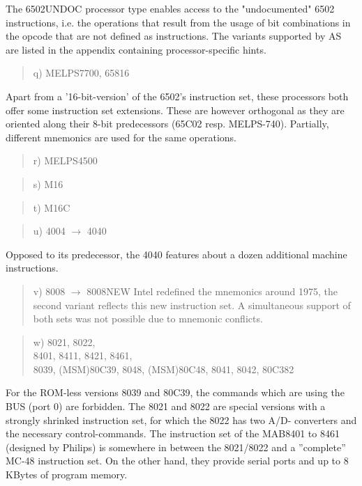 \documentclass[12pt,twoside]{report}
\begin{document}
The 6502UNDOC processor type enables access to the "undocumented"
6502 instructions, i.e. the operations that result from the usage of bit
combinations in the opcode that are not defined as instructions.  The
variants supported by AS are listed in the appendix containing processor-specific
hints.
\begin{quote}
q) MELPS7700, 65816
\end{quote}
Apart from a '16-bit-version' of the 6502's instruction set, these
processors both offer some instruction set extensions.  These are
however orthogonal as they are oriented along their 8-bit
predecessors (65C02 resp. MELPS-740).  Partially, different
mnemonics are used for the same operations.
\begin{quote}
r) MELPS4500
\end{quote}
\begin{quote}
s) M16
\end{quote}
\begin{quote}
t) M16C
\end{quote}
\begin{quote}
u) 4004 $\rightarrow$ 4040
\end{quote}
Opposed to its predecessor, the 4040 features about a dozen additional
machine instructions.
\begin{quote}
v) 8008 $\rightarrow$ 8008NEW
Intel redefined the mnemonics around 1975, the second variant reflects
this new instruction set.  A simultaneous support of both sets was not
possible due to mnemonic conflicts.
\end{quote}
\begin{quote}
w) 8021, 8022, \\
   8401, 8411, 8421, 8461, \\
   8039, (MSM)80C39, 8048, (MSM)80C48, 8041, 8042, 80C382
\end{quote}
For the ROM-less versions 8039 and 80C39, the commands which are
using the BUS (port 0) are forbidden.  The 8021 and 8022 are special
versions with a strongly shrinked instruction set, for which the 8022
has two A/D- converters and the necessary control-commands.  The 
instruction set of the MAB8401 to 8461 (designed by Philips) is
somewhere in between the 8021/8022 and a ''complete'' MC-48 instruction
set.  On the other hand, they provide serial ports and up to 8 KBytes
of program memory.
\end{document}
